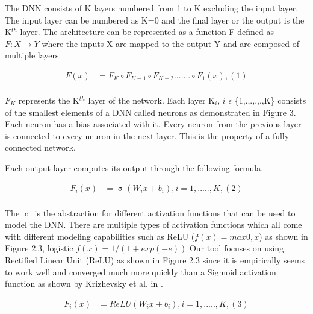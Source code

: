 The DNN consists of K layers numbered from 1 to K excluding the input layer.  The input layer can be numbered as K=0 and the final layer or the output is the K$^{th}$ layer.
The architecture can be represented as a function F defined as $F: X \rightarrow Y$ where the inputs X are mapped to the output Y and are composed of multiple layers. 

\begin{align*}
F(x) &= F_K \circ F_{K-1} \circ F_{K-2} ....... \circ F_1(x),    (1) \\
\end{align*}

$F_K$ represents the K$^{th}$ layer of the network. Each layer K$_{i}$, 
$i$ $\epsilon$ \{1,.,.,.,.,K\} consists of the smallest elements of a DNN called neurons as demonstrated in Figure 3.  Each neuron has a bias associated with it. Every neuron from the previous layer is connected to every neuron in the next layer. This is the property of a fully-connected network. 

Each output layer computes its output through the following formula. 

\begin{align*}
F_i(x) &= \upsigma(W_ix + b_i) ,  i = 1,.....,K, (2)  \\
\end{align*}

The $\upsigma$ is the abstraction for different activation functions that can be used to model the DNN. There are multiple types of activation functions which all come with different modeling capabilities such as ReLU ($f(x) = max {0,x}$) as shown in Figure 2.3, logistic $f(x)=1/(1+ exp(-e))$
 Our tool focuses on using Rectified Linear Unit (ReLU) as shown in Figure 2.3 since it is empirically seems to work well and converged much more quickly than a Sigmoid  activation function as shown by Krizhevsky et al. in \cite{10.1145/3065386}.  %

\begin{align*}
F_i(x) &= ReLU(W_ix + b_i) ,  i = 1,.....,K , (3) \\
\end{align*}


